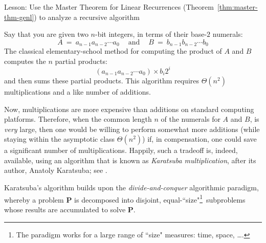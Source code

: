 \begin{enumerate}
  

{\sc Lesson:}
Use the Master Theorem for Linear Recurrences (Theorem~\ref{thm:master-thm-genl}) to analyze a recursive algorithm

\smallskip

Say that you are given two $n$-bit integers, in terms of their base-$2$ numerals: 
\[ A \ = \ a_{n-1} a_{n-2} \cdots a_0 \ \ \ \ \mbox{ and } \ \ \ \ B \ = \ b_{n-1} b_{n-2} \cdots b_0 \]
The classical elementary-school method for computing the product of $A$ and $B$ computes the $n$ partial products:
\[ (a_{n-1} a_{n-2} \cdots a_0) \times b_i 2^i \]
and then sums these partial products.  This algorithm requires $\Theta(n^2)$ multiplications and a like number of additions.

\smallskip

Now, multiplications are more expensive than additions on standard computing platforms.  Therefore, when the common length $n$ of the numerals for $A$ and $B$, is {\em very} large, then one would be willing to perform somewhat more additions (while staying within the asymptotic class $\Theta(n^2)$) if, in compensation, one could save a significant number of multiplications.  Happily, such a tradeoff is, indeed, available, using an algorithm that is known as {\it Karatsuba multiplication}, after its author, Anatoly Karatsuba; see \cite{KaratsubaO62}.

\medskip

Karatsuba's algorithm builds upon the {\it divide-and-conquer} algorithmic paradigm, whereby a
problem {\bf P} is decomposed into disjoint, equal-``size"\footnote{The paradigm works for a large range of ``size" measures: time, space, \ldots.}~subproblems whose results are accumulated to solve {\bf P}.


\bigskip

\noindent {}
\end{enumerate}
